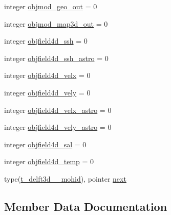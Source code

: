 \begin{DoxyCompactItemize}
\item 
integer \mbox{\hyperlink{structmoduledelft3d__2__mohid_1_1t__delft3d__2__mohid_ae6c84be713d38cb94241aceee6916a66}{objmod\+\_\+geo\+\_\+out}} = 0
\item 
integer \mbox{\hyperlink{structmoduledelft3d__2__mohid_1_1t__delft3d__2__mohid_a3c1b7c68927f74f7cb9b85ff00711633}{objmod\+\_\+map3d\+\_\+out}} = 0
\item 
integer \mbox{\hyperlink{structmoduledelft3d__2__mohid_1_1t__delft3d__2__mohid_ae1d5fc22b166f30e22321d43da27d2d4}{objfield4d\+\_\+ssh}} = 0
\item 
integer \mbox{\hyperlink{structmoduledelft3d__2__mohid_1_1t__delft3d__2__mohid_a45790efa6d26070a6120fe0b87c5ab00}{objfield4d\+\_\+ssh\+\_\+astro}} = 0
\item 
integer \mbox{\hyperlink{structmoduledelft3d__2__mohid_1_1t__delft3d__2__mohid_a2cd848b8756eb1c1334225e3e59b9421}{objfield4d\+\_\+velx}} = 0
\item 
integer \mbox{\hyperlink{structmoduledelft3d__2__mohid_1_1t__delft3d__2__mohid_aaf647ffa6ffbe8f1869b91baa1ccc0eb}{objfield4d\+\_\+vely}} = 0
\item 
integer \mbox{\hyperlink{structmoduledelft3d__2__mohid_1_1t__delft3d__2__mohid_a0c79292fd128d3507abc34fd3c0bb1af}{objfield4d\+\_\+velx\+\_\+astro}} = 0
\item 
integer \mbox{\hyperlink{structmoduledelft3d__2__mohid_1_1t__delft3d__2__mohid_ad0dec3d7dc56d84c483464fd9efcb2c0}{objfield4d\+\_\+vely\+\_\+astro}} = 0
\item 
integer \mbox{\hyperlink{structmoduledelft3d__2__mohid_1_1t__delft3d__2__mohid_a9359ab24ad27f7f2b28c9329d0ab4535}{objfield4d\+\_\+sal}} = 0
\item 
integer \mbox{\hyperlink{structmoduledelft3d__2__mohid_1_1t__delft3d__2__mohid_a2eac3baee9f80b65ec656098a765262a}{objfield4d\+\_\+temp}} = 0
\item 
type(\mbox{\hyperlink{structmoduledelft3d__2__mohid_1_1t__delft3d__2__mohid}{t\+\_\+delft3d\+\_\+\_\+mohid}}), pointer \mbox{\hyperlink{structmoduledelft3d__2__mohid_1_1t__delft3d__2__mohid_a0bcc849693c90cf6d4840d0a18e1f9be}{next}}
\end{DoxyCompactItemize}


\subsection{Member Data Documentation}
\mbox{\label{structmoduledelft3d__2__mohid_1_1t__delft3d__2__mohid_acb8c1e88079adfab1cedeaaf32f3b5a9}} 

